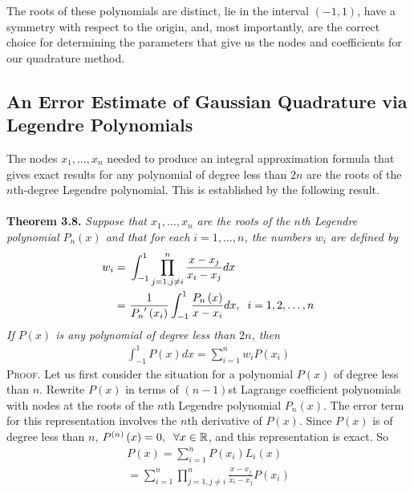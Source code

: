 \documentclass[a4paper]{article}
\numberwithin{equation}{section}
\begin{document}
The roots of these polynomials are distinct, lie in the interval $\left(-1,1\right)$, have a symmetry with respect to the origin, and, most importantly, are the correct choice for determining the parameters that give us the nodes and coefficients for our quadrature method.
\subsection{An Error Estimate of Gaussian Quadrature via Legendre Polynomials}
The nodes $x_1,\ldots,x_n$ needed to produce an integral approximation formula that gives exact results for any polynomial of degree less than $2n$ are the roots of the $n$th-degree Legendre polynomial. This is established by the following result.\\
\\
\textbf{Theorem 3.8.} \textit{Suppose that $x_1,\ldots,x_n$ are the roots of the $n$th Legendre polynomial $P_n\left(x\right)$ and that for each $i=1,\ldots,n$, the numbers $w_i$ are defined by}
\begin{align}
\label{3.69}
{w_i} =&\ \int_{ - 1}^1 {\prod\limits_{j = 1,j \ne i}^n {\frac{{x - {x_j}}}{{{x_i} - {x_j}}}} dx} \\
=&\ \frac{1}{{{P_n}'\left( {{x_i}} \right)}}\int_{ - 1}^1 {\frac{{{P_n}\left( x \right)}}{{x - {x_i}}}dx} ,\hspace{0.2cm}i = 1,2, \ldots ,n \label{3.70}
\end{align}
\textit{If $P\left(x\right)$ is any polynomial of degree less than $2n$, then}
\begin{align}
\int_{ - 1}^1 {P\left( x \right)dx}  = \sum\limits_{i = 1}^n {{w_i}P\left( {{x_i}} \right)} 
\end{align}
\textsc{Proof.} Let us first consider the situation for a polynomial $P\left(x\right)$ of degree less than $n$. Rewrite $P\left(x\right)$ in terms of $\left(n-1\right)$st Lagrange coefficient polynomials with nodes at the roots of the $n$th Legendre polynomial $P_n\left(x\right)$. The error term for this representation involves the $n$th derivative of $P\left(x\right)$. Since $P\left(x\right)$ is of degree less than $n$, ${P^{\left( n \right)}}\left( x \right) = 0,\hspace{0.2cm}\forall x \in \mathbb{R}$, and this representation is exact. So
\begin{align}
P\left( x \right) = \sum\limits_{i = 1}^n {P\left( {{x_i}} \right){L_i}\left( x \right)} \\
 = \sum\limits_{i = 1}^n {\prod\limits_{j = 1,j \ne i}^n {\frac{{x - {x_j}}}{{{x_i} - {x_j}}}} P\left( {{x_i}} \right)} 
\end{align}
\end{document}
